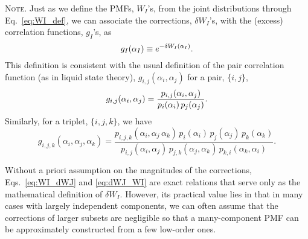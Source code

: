 \documentclass[preprint, superscriptaddress]{revtex4-1}
\newcommand{\note}[1]{{\color{DarkGreen}\footnotesize \textsc{Note.} #1}}
\begin{document}

\note{
Just as we define the PMFs, $W_I$'s, from the joint distributions
through Eq.~\eqref{eq:WI_def},
we can associate the corrections, $\delta W_I$'s,
with the (excess) correlation functions, $g_I$'s, as
%
\begin{equation}
  g_I(\alpha_I) \equiv e^{-\delta W_I(\alpha_I)}
  .
  \notag
\end{equation}
%
This definition is consistent with the usual definition
of the pair correlation function (as in liquid state theory\cite{hansen}),
$g_{i,j}(\alpha_i, \alpha_j)$ for a pair, $\{i, j\}$,
\begin{equation}
  g_{i,j}(\alpha_i, \alpha_j)
  =
  \frac{ p_{i,j}(\alpha_i, \alpha_j) } { p_i(\alpha_i) \, p_j(\alpha_j) }
  .
  \notag
\end{equation}
Similarly, for a triplet, $\{i, j, k\}$, we have
$$
g_{i,j,k}(\alpha_i, \alpha_j, \alpha_k)
=
\frac{ p_{i,j,k}(\alpha_i, \alpha_j \, \alpha_k) \, p_i(\alpha_i) \, p_j(\alpha_j) \, p_k(\alpha_k) }{ p_{i,j}(\alpha_i, \alpha_j) \, p_{j,k}(\alpha_j, \alpha_k) \, p_{k,i}(\alpha_k, \alpha_i) }
.
$$
}



Without a priori assumption on the magnitudes of the corrections,
Eqs.~\eqref{eq:WI_dWJ} and \eqref{eq:dWJ_WI} are exact relations
that serve only as the mathematical definition of $\delta W_I$.
%
However, its practical value lies in that in many cases
with largely independent components,
we can often assume
that the corrections of larger subsets are negligible
so that a many-component PMF can be approximately constructed
from a few low-order ones.
\end{document}
